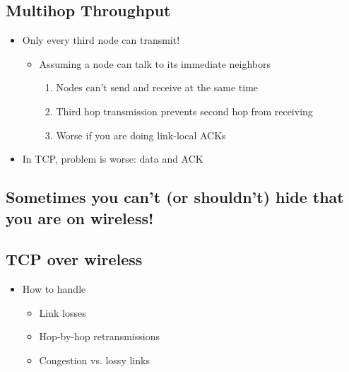 \subsection{Multihop Throughput}
\begin{figure}[H]
\end{figure}
\begin{itemize}[nosep]
    \item Only every third node can transmit!
          \begin{itemize}[nosep]
              \item Assuming a node can talk to its immediate neighbors
                    \begin{enumerate}[label=(\arabic*)]
                        \item Nodes can't send and receive at the same time
                        \item Third hop transmission prevents second hop from receiving
                        \item Worse if you are doing link-local ACKs
                    \end{enumerate}
          \end{itemize}
    \item In TCP, problem is worse: data and ACK
\end{itemize}

\subsection{Sometimes you can't (or shouldn't) hide that you are on wireless!}

\subsection{TCP over wireless}
\begin{itemize}[nosep]
    \item How to handle
          \begin{itemize}[nosep]
              \item Link losses
              \item Hop-by-hop retransmissions
              \item Congestion vs. lossy links
          \end{itemize}
\end{itemize}

